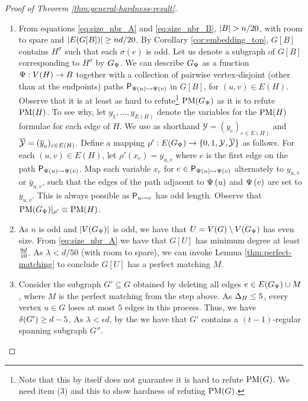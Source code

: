 \documentclass[11pt]{article}
\begin{document}
\begin{proof}[Proof of Theorem \ref{thm:general-hardness-result}]
\begin{enumerate}
\item{From equations \eqref{eq:size_nbr_A} and \eqref{eq:size_nbr_B}, $|B| > n/20$, with room to spare and $|E(G[B])| \ge nd/20$.
    By Corollary \ref{cor:embedding_top}, $G[B]$ contains $H^{\sigma}$ such that each $\sigma(e)$ is odd. Let us denote a subgraph of $G[B]$ corresponding to $H^{\sigma}$ by $G_{\Psi}$.
    We can describe $G_\Psi$ as a function $\Psi: V(H) \to B$ together with a collection of pairwise vertex-disjoint (other than at the endpoints) paths  $\mathsf{P}_{\Psi\left(u\right) \rightsquigarrow \Psi\left(v\right) }$ in $G[B]$, for $(u,v) \in E(H)$.
    Observe that it is at least as hard to refute\footnote{Note that this by itself does not guarantee it is hard to refute $\text{PM}(G)$. We need item (3) and this to show hardness of refuting $\text{PM}(G)$.} $\text{PM}(G_{\Psi})$ as it is to refute $\text{PM}(H)$.
To see why, let $y_1, \dots, y_{E(H)}$ denote the variables for the $\text{PM}(H)$ formulae for each edge of $H$.
We use as shorthand $\mathcal{Y} = (y_e)_{e \in E(H)}$ and $\overline{\mathcal{Y}} = (\overline{y}_e)_{e \in E(H)}$.
Define a mapping $\rho': E(G_\Psi) \to \{0,1, \mathcal{Y}, \overline{\mathcal{Y}} \}$ as follows. For each $(u,v) \in E(H)$, let $\rho'(x_e) = y_{u,v}$ where $e$ is the first edge on the path $\mathsf{P}_{\Psi\left(u\right) \rightsquigarrow \Psi\left(v\right) }$.
Map each variable $x_e$ for $e \in \mathsf{P}_{\Psi\left(u\right) \rightsquigarrow \Psi\left(v\right) }$ alternately to $y_{u,v}$ or $\bar{y}_{u,v}$, such that the edges of the path adjacent to $\Psi\left(u\right)$ and $\Psi\left(v\right)$ are set to $y_{u,v}$. This is always possible as $\mathsf{P}_{u \rightsquigarrow v }$ has odd length. Observe that $\text{PM}(G_\Psi)|_{\rho'} \equiv \text{PM}(H)$. 
  }

\item{ As $n$ is odd and $|V(G_{\Psi})|$ is odd, we have that $U = V(G) \setminus V(G_{\Psi})$ has even size. From \eqref{eq:size_nbr_A} we have that $G[U]$ has minimum degree at least $\frac{9d}{10}$. As $\lambda < d/50$ (with room to spare), we can invoke Lemma \ref{thm:perfect-matching} to conclude $G[U]$ has a perfect matching $M$. 
}
  
\item{
  Consider the subgraph $G' \subseteq G$ obtained by deleting all edges $e \in E(G_{\Psi}) \cup M$, where $M$ is the perfect matching from the step above. As $\Delta_{H} \leq 5$, every vertex $u \in G$ loses at most $5$ edges in this process. Thus, we have $\delta({G'}) \ge d - 5$. As $\lambda < \epsilon d$, by the  we have that $G'$ contains a $(t-1)$-regular spanning subgraph $G''$. }


\end{enumerate}
\end{proof}
\end{document}
